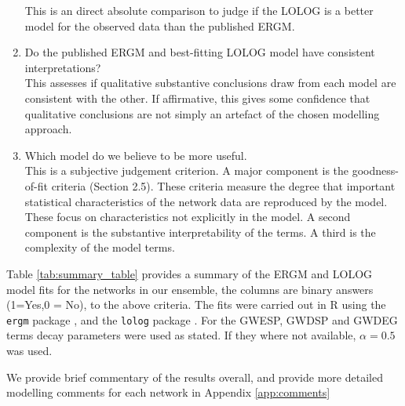 \documentclass[
]{statsoc}
\begin{document}
\begin{enumerate}
This is an direct absolute comparison to judge if the LOLOG is a better model for the observed data than the published ERGM.
\item Do the published ERGM and best-fitting LOLOG model have consistent interpretations?\\
This assesses if qualitative substantive conclusions draw from each model are consistent with the other.
If affirmative, this gives some confidence that qualitative conclusions are not simply an artefact of the chosen modelling approach.
\item Which model do we believe to be more useful.\\
This is a subjective judgement criterion. A major component is the goodness-of-fit criteria (Section 2.5). These criteria measure the degree that important statistical characteristics of the network data are reproduced by the model. These focus on characteristics not explicitly in the model. A second component is the substantive interpretability of the terms. A third is the complexity of the model terms.
\end{enumerate}

Table \ref{tab:summary_table} provides a summary of the ERGM and LOLOG
model fits for the networks in our ensemble, the columns are binary
answers (1=Yes,0 = No), to the above criteria. The fits were carried out
in R using the \texttt{ergm} package \citep{ergm_3_9_4}, and the
\texttt{lolog} package \citep{LOLOG_github}. For the GWESP, GWDSP and
GWDEG terms decay parameters were used as stated. If they where not
available, \(\alpha= 0.5\) was used.

We provide brief commentary of the results overall, and provide more
detailed modelling comments for each network in Appendix
\ref{app:comments}
\end{document}
